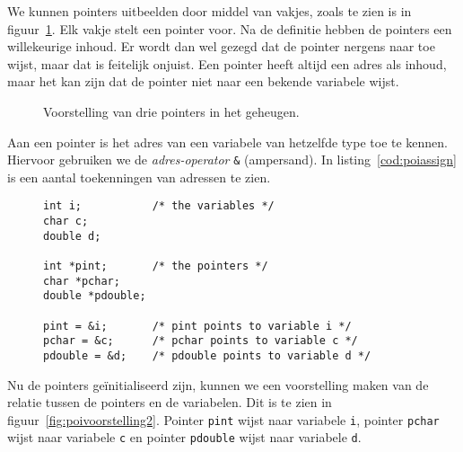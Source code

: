 We kunnen pointers uitbeelden door middel van vakjes, zoals te zien is in figuur~\ref{fig:poivoorstelling1}. Elk vakje stelt een pointer voor. Na de definitie hebben de pointers een willekeurige inhoud. Er wordt dan wel gezegd dat de pointer nergens naar toe wijst, maar dat is feitelijk onjuist. Een pointer heeft altijd een adres als inhoud, maar het kan zijn dat de pointer niet naar een bekende variabele wijst.

\begin{figure}[!ht]
\centering
{}
\caption{Voorstelling van drie pointers in het geheugen.}
\label{fig:poivoorstelling1}
\end{figure}

Aan een pointer is het adres van een variabele van hetzelfde type toe te kennen. Hiervoor gebruiken we de \textsl{adres-operator} \texttt{\&} (ampersand). In listing~\ref{cod:poiassign} is een aantal toekenningen van adressen te zien.

\begin{figure}[H]
\begin{lstlisting}[caption=Enkele toekenningen van adressen aan pointers.,label=cod:poiassign]
int i;           /* the variables */
char c;
double d;

int *pint;       /* the pointers */
char *pchar;
double *pdouble;

pint = &i;       /* pint points to variable i */
pchar = &c;      /* pchar points to variable c */
pdouble = &d;    /* pdouble points to variable d */
\end{lstlisting}
\end{figure}

Nu de pointers geïnitialiseerd zijn, kunnen we een voorstelling maken van de relatie tussen de pointers en de variabelen. Dit is te zien in figuur~\ref{fig:poivoorstelling2}. Pointer \texttt{pint} wijst naar variabele \texttt{i}, pointer \texttt{pchar} wijst naar variabele \texttt{c} en pointer \texttt{pdouble} wijst naar variabele \texttt{d}.

